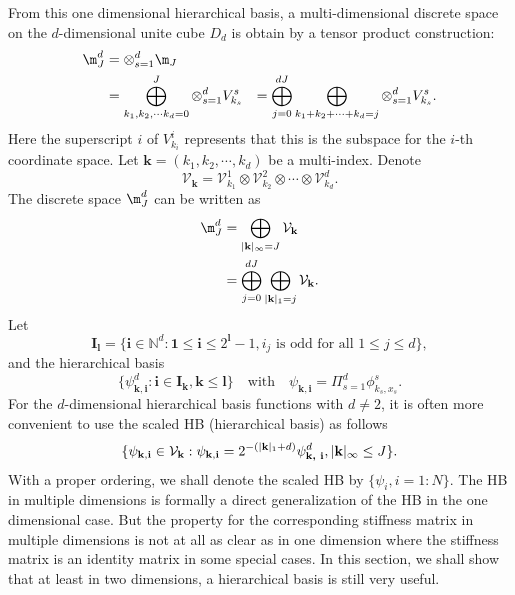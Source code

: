 From this one dimensional hierarchical basis, a multi-dimensional discrete space on the $d$-dimensional unite cube $D_d$ is obtain by a tensor product construction:
\begin{equation}
\begin{aligned}
\m_J^d &= \otimes_{s=1}^d \m_J\\%
&= \bigoplus_{k_1,k_2,\cdots k_d=0}^J  \otimes_{s=1}^d V_{k_s}^s%
&= \bigoplus_{j=0}^{dJ}\bigoplus_{k_1+k_2+\cdots + k_d= j}  \otimes_{s=1}^d V_{k_s}^s.%
\end{aligned}
\end{equation}
Here the superscript $i$ of $V_{k_i}^i$ represents that this is the subspace for the $i$-th coordinate space.
Let $\mathbf{k}=(k_1,k_2,\cdots,k_d)$ be a multi-index. Denote
$$
\mathcal V_{\mathbf{k}} = \mathcal V_{k_1}^1 \otimes  \mathcal V_{k_2}^2\otimes\cdots \otimes  \mathcal V_{k_d}^d.
$$
The discrete space $\m_J^d$ can be written as 
\begin{equation}
\begin{aligned}
\m_J^d &= \bigoplus_{|\mathbf{k}|_\infty=J} \mathcal V_{\mathbf{k}} \\
&= \bigoplus_{j=0}^{dJ}\bigoplus_{|\mathbf{k}|_1=j} \mathcal V_{\mathbf{k}}.
\end{aligned}
\end{equation}
Let 
$$
\mathbf{I_l}=\{\mathbf{i}\in \mathbb{N}^d: \mathbf{1}\le \mathbf{i}\le 2^\mathbf{l}-1, i_j \text{ is odd for all }1\le j\le d\},
$$
and the hierarchical basis 
$$
\{\psi_\mathbf{k, i}^d: \mathbf{i}\in \mathbf{I_k}, \mathbf{k}\le \mathbf{l}\}\quad \mbox{with}\quad \psi_\mathbf{k, i}=\Pi_{s=1}^d\phi_{k_s,x_s}^s.
$$
For the $d$-dimensional hierarchical basis functions with $d\neq 2$, it is often more convenient to use the scaled HB
(hierarchical basis)
as follows
\begin{equation}
\label{shb}
\{\psi_\mathbf{k, i} \in {\cal V}_{\mathbf{k}}: \psi_\mathbf{k, i}=2^{-(|\mathbf{k}|_1+d)}\psi_{ \textbf{k, i}}^d, |\mathbf{k}|_\infty\le J\}. 
\end{equation}
With a proper ordering, we shall denote the scaled HB by $\{\psi_i,
i=1:N\}$. The HB in multiple dimensions is formally a direct generalization of the
HB in the one dimensional case.  But the property for the corresponding
stiffness matrix in multiple dimensions is not at all as clear as in one
dimension where the stiffness matrix is an identity matrix in some
special cases.  In this section, we shall show that at least in two
dimensions, a hierarchical basis is still very useful.




